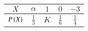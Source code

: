 \begin{tabular}[12pt]{ |c|c|c|c|c|}
    \hline
    $X$ & $\alpha$ & $1$ & $0$ & $-3$\\
    \hline
    $P\left(X\right)$ & $\frac{1}{3}$ & $K$ & $\frac{1}{6}$ & $\frac{1}{4}$\\
    \hline
    \end{tabular}
